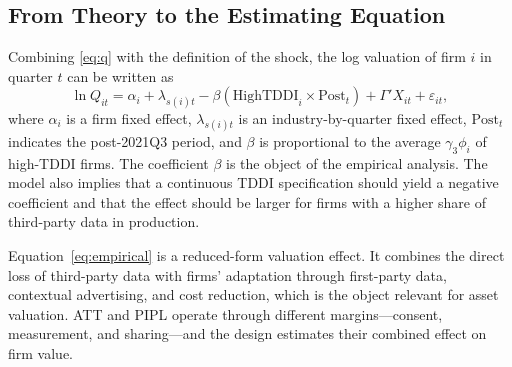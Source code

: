 \subsection{From Theory to the Estimating Equation}

Combining \eqref{eq:q} with the definition of the shock, the log valuation of firm $i$ in quarter $t$ can be written as
\begin{equation}
\ln Q_{it}=\alpha_i+\lambda_{s(i)t}-\beta\left(\text{HighTDDI}_i\times\text{Post}_t\right)+\Gamma'X_{it}+\varepsilon_{it},
\label{eq:empirical}
\end{equation}
where $\alpha_i$ is a firm fixed effect, $\lambda_{s(i)t}$ is an industry-by-quarter fixed effect, $\text{Post}_t$ indicates the post-2021Q3 period, and $\beta$ is proportional to the average $\gamma_3\phi_i$ of high-TDDI firms. The coefficient $\beta$ is the object of the empirical analysis. The model also implies that a continuous TDDI specification should yield a negative coefficient and that the effect should be larger for firms with a higher share of third-party data in production.

Equation~\eqref{eq:empirical} is a reduced-form valuation effect. It combines the direct loss of third-party data with firms' adaptation through first-party data, contextual advertising, and cost reduction, which is the object relevant for asset valuation. ATT and PIPL operate through different margins---consent, measurement, and sharing---and the design estimates their combined effect on firm value.
